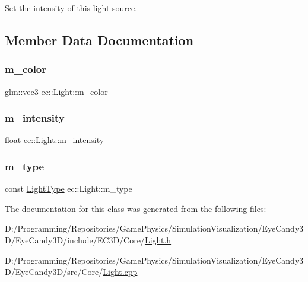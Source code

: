 Set the intensity of this light source. 



\subsection{Member Data Documentation}
\mbox{\label{classec_1_1_light_a7dfc41f1e8f2d7ddad97d60c610c302e}} 
\subsubsection{\texorpdfstring{m\+\_\+color}{m\_color}}
{\footnotesize\ttfamily glm\+::vec3 ec\+::\+Light\+::m\+\_\+color\hspace{0.3cm}{\ttfamily [protected]}}

\mbox{\label{classec_1_1_light_ac655cc4148d5aa4d052bace97770f3b1}} 
\subsubsection{\texorpdfstring{m\+\_\+intensity}{m\_intensity}}
{\footnotesize\ttfamily float ec\+::\+Light\+::m\+\_\+intensity\hspace{0.3cm}{\ttfamily [protected]}}

\mbox{\label{classec_1_1_light_ae3d04075982c6c62e7687b214a504c30}} 
\subsubsection{\texorpdfstring{m\+\_\+type}{m\_type}}
{\footnotesize\ttfamily const \mbox{\hyperlink{namespaceec_a30e2a743ebdeb02ac68a6cfa50f629c7}{Light\+Type}} ec\+::\+Light\+::m\+\_\+type\hspace{0.3cm}{\ttfamily [protected]}}



The documentation for this class was generated from the following files\+:\begin{DoxyCompactItemize}
\item 
D\+:/\+Programming/\+Repositories/\+Game\+Physics/\+Simulation\+Visualization/\+Eye\+Candy3\+D/\+Eye\+Candy3\+D/include/\+E\+C3\+D/\+Core/\mbox{\hyperlink{_light_8h}{Light.\+h}}\item 
D\+:/\+Programming/\+Repositories/\+Game\+Physics/\+Simulation\+Visualization/\+Eye\+Candy3\+D/\+Eye\+Candy3\+D/src/\+Core/\mbox{\hyperlink{_light_8cpp}{Light.\+cpp}}\end{DoxyCompactItemize}
